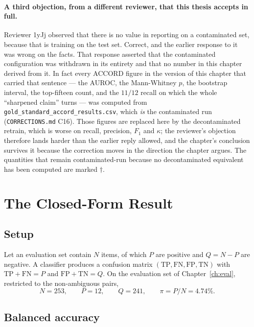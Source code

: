 \paragraph{A third objection, from a different reviewer, that this thesis
accepts in full.} Reviewer 1yJj observed that there is no value in reporting on
a contaminated set, because that is training on the test set. Correct, and the
earlier response to it was wrong on the facts. That response asserted that the
contaminated configuration was withdrawn in its entirety and that no number in
this chapter derived from it. In fact every ACCORD figure in the version of this
chapter that carried that sentence --- the AUROC, the Mann-Whitney $p$, the
bootstrap interval, the top-fifteen count, and the $11/12$ recall on which the
whole ``sharpened claim'' turns --- was computed from
\texttt{gold\_standard\_accord\_results.csv}, which \emph{is} the contaminated
run (\texttt{CORRECTIONS.md} C16). Those figures are replaced here by the
decontaminated retrain, which is worse on recall, precision, $F_1$ and $\kappa$;
the reviewer's objection therefore lands harder than the earlier reply allowed,
and the chapter's conclusion survives it because the correction moves in the
direction the chapter argues. The quantities that remain contaminated-run
because no decontaminated equivalent has been computed are marked $\dagger$.

\section{The Closed-Form Result}
\label{sec:met-closedform}

\subsection{Setup}

Let an evaluation set contain $N$ items, of which $P$ are positive and
$Q = N - P$ are negative. A classifier produces a confusion matrix
$(\mathrm{TP}, \mathrm{FN}, \mathrm{FP}, \mathrm{TN})$ with
$\mathrm{TP} + \mathrm{FN} = P$ and $\mathrm{FP} + \mathrm{TN} = Q$. On the
evaluation set of Chapter~\ref{ch:eval}, restricted to the non-ambiguous pairs,
\[
N = 253, \qquad P = 12, \qquad Q = 241, \qquad \pi = P/N = 4.74\% .
\]

\subsection{Balanced accuracy}

